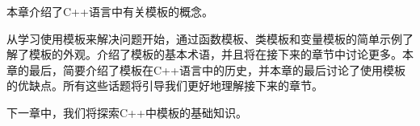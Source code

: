 本章介绍了C++语言中有关模板的概念。

从学习使用模板来解决问题开始，通过函数模板、类模板和变量模板的简单示例了解了模板的外观。介绍了模板的基本术语，并且将在接下来的章节中讨论更多。本章的最后，简要介绍了模板在C++语言中的历史，并本章的最后讨论了使用模板的优缺点。所有这些话题将引导我们更好地理解接下来的章节。

下一章中，我们将探索C++中模板的基础知识。